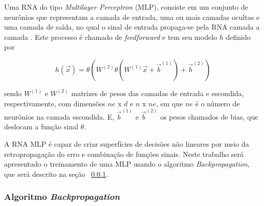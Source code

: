 \documentclass[12pt,a4paper,utf8]{ppgsi}
\begin{document}

Uma RNA do tipo \textit{Multilayer Perceptron} (MLP), consiste em um conjunto de neurônios que representam a camada de entrada, uma ou mais camadas ocultas e uma camada de saída, no qual o sinal de entrada propaga-se pela RNA camada a camada \citep{sassi2006arquitetura}. Este processo é chamado de \textit{feedforward} e tem seu modelo $h$ definido por

\begin{dmath*} \label{eq:ff}
    h(\vec{x}) = \theta \left( W^{(2)} \theta \left( W^{(1)}\vec{x} + \vec{b}^{(1)} \right) + \vec{b}^{(2)} \right)
\end{dmath*}

\noindent sendo $W^{(1)}$ e $W^{(2)}$ matrizes de pesos das camadas de entrada e escondida, respectivamente, com dimensões $ne$ x $d$ e $n$ x $ne$, em que $ne$ é o número de neurônios na camada escondida. E, $\vec{b}^{(1)}$ e $\vec{b}^{(2)}$ os pesos chamados de bias, que deslocam a função sinal $\theta$.

A RNA MLP é capaz de criar superfícies de decisões não lineares por meio da retropropagação do erro e combinação de funções sinais. Neste trabalho será apresentado o treinamento de uma MLP usando o algoritmo \textit{Backpropagation}, que será descrito na seção ~\ref{sec:backprop}.

\subsubsection{Algoritmo \textit{Backpropagation}} \label{sec:backprop}
\end{document}
